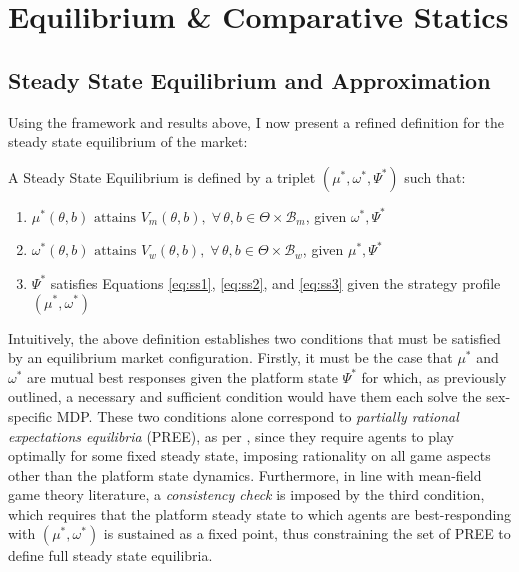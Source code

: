 \section{Equilibrium \& Comparative Statics}
\label{sec:section3} 
\subsection{Steady State Equilibrium and Approximation}\label{sec:section3.1} 
Using the framework and results above, I now present a refined definition for the steady state equilibrium of the market: 
\begin{definition}
    A Steady State Equilibrium is defined by a triplet $(\mu^*, \omega^*, \Psi^*)$ such that:
    \begin{enumerate}
        \item $ \mu^*(\theta,b) \text{ attains } V_m(\theta,b), \; \forall\, \theta, b \in \Theta \times \mathcal{B}_m$, given $\omega^*,\Psi^*$
        \item $ \omega^*(\theta,b) \text{ attains } V_w(\theta,b), \; \forall\, \theta, b \in \Theta \times \mathcal{B}_w$, given $\mu^*,\Psi^*$
        \item $\Psi^*$ satisfies Equations \ref{eq:ss1}, \ref{eq:ss2}, and \ref{eq:ss3} given the strategy profile $(\mu^*, \omega^*)$
    \end{enumerate} 
\end{definition}

Intuitively, the above definition establishes two conditions that must be satisfied by an equilibrium market configuration. 
Firstly, it must be the case that $\mu^*$ and $\omega^*$ are mutual best responses given the platform state $\Psi^*$ for which, as previously outlined, a necessary and sufficient condition would have them each solve the sex-specific MDP. 
These two conditions alone correspond to \textit{partially rational expectations equilibria} (PREE), as per \cite{burdett1997marriage}, since they require agents to play optimally for some fixed steady state, imposing rationality on all game aspects other than the platform state dynamics.  
Furthermore, in line with mean-field game theory literature, a \textit{consistency check} is imposed by the third condition, which requires that the platform steady state to which agents are best-responding with $(\mu^*,\omega^*)$ is sustained as a fixed point, thus constraining the set of PREE to define full steady state equilibria. 

